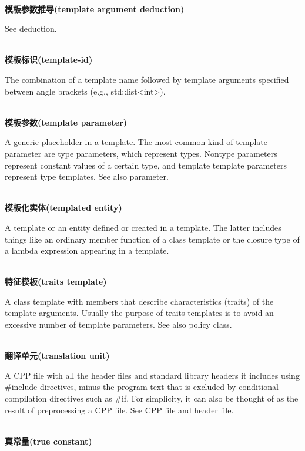 \hspace*{\fill} \\ %
\noindent
\textbf{模板参数推导(template argument deduction)}

See deduction.

\hspace*{\fill} \\ %
\noindent
\textbf{模板标识(template-id)}

The combination of a template name followed by template arguments specified between angle brackets (e.g., std::list<int>).

\hspace*{\fill} \\ %
\noindent
\textbf{模板参数(template parameter)}

A generic placeholder in a template. The most common kind of template parameter are type parameters, which represent types. Nontype parameters represent constant values of a certain type, and template template parameters represent type templates. See also parameter.

\hspace*{\fill} \\ %
\noindent
\textbf{模板化实体(templated entity)}

A template or an entity defined or created in a template. The latter includes things like an ordinary member function of a class template or the closure type of a lambda expression appearing in a template.

\hspace*{\fill} \\ %
\noindent
\textbf{特征模板(traits template)}

A class template with members that describe characteristics (traits) of the template arguments. Usually the purpose of traits templates is to avoid an excessive number of template parameters. See also policy class.

\hspace*{\fill} \\ %
\noindent
\textbf{翻译单元(translation unit)}

A CPP file with all the header files and standard library headers it includes using \#include directives, minus the program text that is excluded by conditional compilation directives such as \#if. For simplicity, it can also be thought of as the result of preprocessing a CPP file. See CPP file and header file.

\hspace*{\fill} \\ %
\noindent
\textbf{真常量(true constant)}

